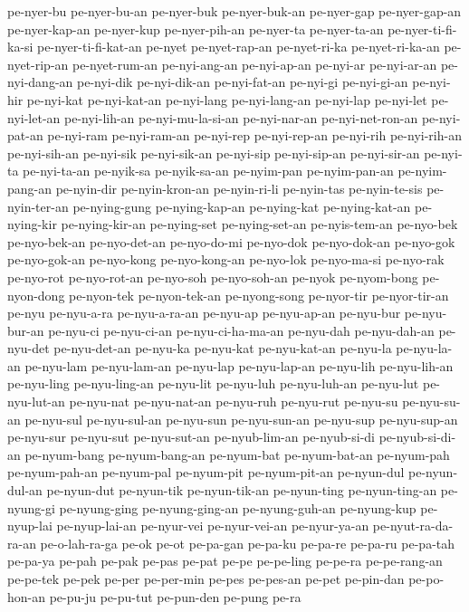 {pe-nyer-bu pe-nyer-bu-an pe-nyer-buk pe-nyer-buk-an pe-nyer-gap
pe-nyer-gap-an pe-nyer-kap-an pe-nyer-kup pe-nyer-pih-an pe-nyer-ta
pe-nyer-ta-an pe-nyer-ti-fi-ka-si pe-nyer-ti-fi-kat-an pe-nyet
pe-nyet-rap-an pe-nyet-ri-ka pe-nyet-ri-ka-an pe-nyet-rip-an
pe-nyet-rum-an pe-nyi-ang-an pe-nyi-ap-an pe-nyi-ar pe-nyi-ar-an
pe-nyi-dang-an pe-nyi-dik pe-nyi-dik-an pe-nyi-fat-an pe-nyi-gi
pe-nyi-gi-an pe-nyi-hir pe-nyi-kat pe-nyi-kat-an pe-nyi-lang
pe-nyi-lang-an pe-nyi-lap pe-nyi-let pe-nyi-let-an pe-nyi-lih-an
pe-nyi-mu-la-si-an pe-nyi-nar-an pe-nyi-net-ron-an pe-nyi-pat-an
pe-nyi-ram pe-nyi-ram-an pe-nyi-rep pe-nyi-rep-an pe-nyi-rih pe-nyi-rih-an
pe-nyi-sih-an pe-nyi-sik pe-nyi-sik-an pe-nyi-sip pe-nyi-sip-an
pe-nyi-sir-an pe-nyi-ta pe-nyi-ta-an pe-nyik-sa pe-nyik-sa-an pe-nyim-pan
pe-nyim-pan-an pe-nyim-pang-an pe-nyin-dir pe-nyin-kron-an pe-nyin-ri-li
pe-nyin-tas pe-nyin-te-sis pe-nyin-ter-an pe-nying-gung pe-nying-kap-an
pe-nying-kat pe-nying-kat-an pe-nying-kir pe-nying-kir-an pe-nying-set
pe-nying-set-an pe-nyis-tem-an pe-nyo-bek pe-nyo-bek-an pe-nyo-det-an
pe-nyo-do-mi pe-nyo-dok pe-nyo-dok-an pe-nyo-gok pe-nyo-gok-an pe-nyo-kong
pe-nyo-kong-an pe-nyo-lok pe-nyo-ma-si pe-nyo-rak pe-nyo-rot pe-nyo-rot-an
pe-nyo-soh pe-nyo-soh-an pe-nyok pe-nyom-bong pe-nyon-dong pe-nyon-tek
pe-nyon-tek-an pe-nyong-song pe-nyor-tir pe-nyor-tir-an pe-nyu pe-nyu-a-ra
pe-nyu-a-ra-an pe-nyu-ap pe-nyu-ap-an pe-nyu-bur pe-nyu-bur-an pe-nyu-ci
pe-nyu-ci-an pe-nyu-ci-ha-ma-an pe-nyu-dah pe-nyu-dah-an pe-nyu-det
pe-nyu-det-an pe-nyu-ka pe-nyu-kat pe-nyu-kat-an pe-nyu-la pe-nyu-la-an
pe-nyu-lam pe-nyu-lam-an pe-nyu-lap pe-nyu-lap-an pe-nyu-lih pe-nyu-lih-an
pe-nyu-ling pe-nyu-ling-an pe-nyu-lit pe-nyu-luh pe-nyu-luh-an pe-nyu-lut
pe-nyu-lut-an pe-nyu-nat pe-nyu-nat-an pe-nyu-ruh pe-nyu-rut pe-nyu-su
pe-nyu-su-an pe-nyu-sul pe-nyu-sul-an pe-nyu-sun pe-nyu-sun-an pe-nyu-sup
pe-nyu-sup-an pe-nyu-sur pe-nyu-sut pe-nyu-sut-an pe-nyub-lim-an
pe-nyub-si-di pe-nyub-si-di-an pe-nyum-bang pe-nyum-bang-an pe-nyum-bat
pe-nyum-bat-an pe-nyum-pah pe-nyum-pah-an pe-nyum-pal pe-nyum-pit
pe-nyum-pit-an pe-nyun-dul pe-nyun-dul-an pe-nyun-dut pe-nyun-tik
pe-nyun-tik-an pe-nyun-ting pe-nyun-ting-an pe-nyung-gi pe-nyung-ging
pe-nyung-ging-an pe-nyung-guh-an pe-nyung-kup pe-nyup-lai pe-nyup-lai-an
pe-nyur-vei pe-nyur-vei-an pe-nyur-ya-an pe-nyut-ra-da-ra-an
pe-o-lah-ra-ga pe-ok pe-ot pe-pa-gan pe-pa-ku pe-pa-re pe-pa-ru pe-pa-tah
pe-pa-ya pe-pah pe-pak pe-pas pe-pat pe-pe pe-pe-ling pe-pe-ra
pe-pe-rang-an pe-pe-tek pe-pek pe-per pe-per-min pe-pes pe-pes-an pe-pet
pe-pin-dan pe-po-hon-an pe-pu-ju pe-pu-tut pe-pun-den pe-pung pe-ra
}
